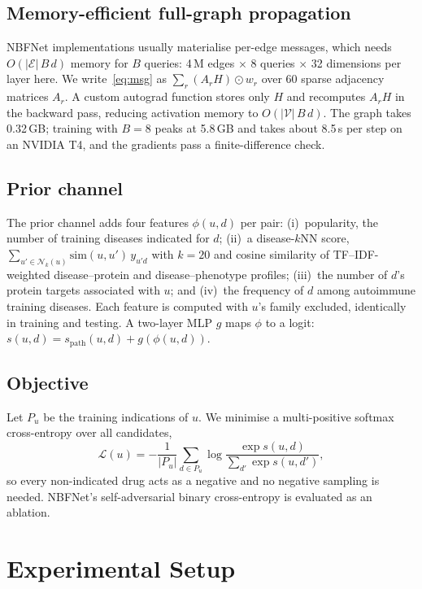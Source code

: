 \documentclass{ieeeaccess}
\begin{document}
\subsection{Memory-efficient full-graph propagation}
NBFNet implementations usually materialise per-edge messages, which needs $O(|\mathcal{E}|\,B\,d)$ memory for $B$ queries: 4\,M edges $\times$ 8 queries $\times$ 32 dimensions per layer here. We write~\eqref{eq:msg} as $\sum_r (A_r H)\odot w_r$ over 60 sparse adjacency matrices $A_r$. A custom autograd function stores only $H$ and recomputes $A_r H$ in the backward pass, reducing activation memory to $O(|\mathcal{V}|\,B\,d)$. The graph takes 0.32\,GB; training with $B=8$ peaks at 5.8\,GB and takes about 8.5\,s per step on an NVIDIA T4, and the gradients pass a finite-difference check.

\subsection{Prior channel}
The prior channel adds four features $\phi(u,d)$ per pair: (i)~popularity, the number of training diseases indicated for $d$; (ii)~a disease-$k$NN score, $\sum_{u'\in\mathcal{N}_k(u)}\mathrm{sim}(u,u')\,y_{u'd}$ with $k=20$ and cosine similarity of TF--IDF-weighted disease--protein and disease--phenotype profiles; (iii)~the number of $d$'s protein targets associated with $u$; and (iv)~the frequency of $d$ among autoimmune training diseases. Each feature is computed with $u$'s family excluded, identically in training and testing. A two-layer MLP $g$ maps $\phi$ to a logit: $s(u,d)=s_\text{path}(u,d)+g(\phi(u,d))$.

\subsection{Objective}
Let $P_u$ be the training indications of $u$. We minimise a multi-positive softmax cross-entropy over all candidates,
\begin{equation}
\mathcal{L}(u)=-\frac{1}{|P_u|}\sum_{d\in P_u}\log\frac{\exp s(u,d)}{\sum_{d'}\exp s(u,d')},
\end{equation}
so every non-indicated drug acts as a negative and no negative sampling is needed. NBFNet's self-adversarial binary cross-entropy is evaluated as an ablation.

\section{Experimental Setup}
\label{sec:setup}
\end{document}
